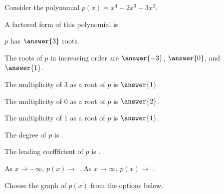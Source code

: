 \documentclass{ximera}
\author{Kenneth Berglund}
\begin{document}
Consider the polynomial $p(x) = x^4 + 2x^3 - 3x^2$. 

\begin{exercise}
A factored form of this polynomial is 
\begin{multipleChoice}
\end{multipleChoice}

\begin{exercise}
$p$ has $\answer{3}$ roots.

\begin{exercise}
The roots of $p$ in increasing order are $\answer{-3}$, $\answer{0}$, and $\answer{1}$.

\begin{exercise}
The multiplicity of 3 as a root of $p$ is $\answer{1}$.

The multiplicity of 0 as a root of $p$ is $\answer{2}$. 

The multiplicity of 1 as a root of $p$ is $\answer{1}$. 

\begin{exercise}
The degree of $p$ is .

The leading coeffficient of $p$ is .

As $x \to -\infty$, $p(x) \to$ \wordChoice{\choice[correct]{$\infty$}\choice{$-\infty$}}. As $x \to \infty$, $p(x) \to$ \wordChoice{\choice[correct]{$\infty$}\choice{$-\infty$}}.

\begin{exercise}
Choose the graph of $p(x)$ from the options below.

\begin{image}
\end{image} 


\end{exercise}
\end{exercise}
\end{exercise}
\end{exercise}
\end{exercise}
\end{exercise}
\end{document}
